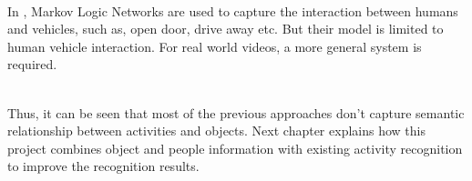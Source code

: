 ~\\
In \cite{Parking}, Markov Logic Networks are used to capture the interaction
between humans and vehicles, such as, open door, drive away etc. 
But their model is limited to human vehicle interaction.
For real world videos, a more general system is required.

~\\
Thus, it can be seen that most of the previous approaches don't capture semantic relationship between activities and objects.
Next chapter explains how this project combines object and people information
with existing activity recognition to improve the recognition results.

